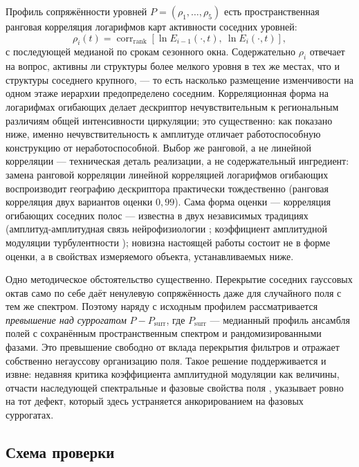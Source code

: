 \documentclass[11pt,a4paper]{article}
\begin{document}
Профиль сопряжённости уровней $P=(\rho_1,\dots,\rho_5)$ есть пространственная ранговая корреляция логарифмов карт активности соседних уровней:
\begin{equation}
\rho_i(t)=\operatorname{corr}_{\mathrm{rank}}\!\left[\ln E_{i-1}(\cdot,t),\ \ln E_{i}(\cdot,t)\right],
\label{eq:rho}
\end{equation}
с последующей медианой по срокам сезонного окна. Содержательно $\rho_i$ отвечает на вопрос, активны ли структуры более мелкого уровня в тех же местах, что и структуры соседнего крупного, --- то есть насколько размещение изменчивости на одном этаже иерархии предопределено соседним. Корреляционная форма на логарифмах огибающих делает дескриптор нечувствительным к региональным различиям общей интенсивности циркуляции; это существенно: как показано ниже, именно нечувствительность к амплитуде отличает работоспособную конструкцию от неработоспособной. Выбор же ранговой, а не линейной корреляции --- техническая деталь реализации, а не содержательный ингредиент: замена ранговой корреляции линейной корреляцией логарифмов огибающих воспроизводит географию дескриптора практически тождественно (ранговая корреляция двух вариантов оценки $0{,}99$). Сама форма оценки --- корреляция огибающих соседних полос --- известна в двух независимых традициях (амплитуд-амплитудная связь нейрофизиологии \cite{Bruns2000,Canolty2006}; коэффициент амплитудной модуляции турбулентности \cite{Mathis2009}); новизна настоящей работы состоит не в форме оценки, а в свойствах измеряемого объекта, устанавливаемых ниже.

Одно методическое обстоятельство существенно. Перекрытие соседних гауссовых октав само по себе даёт ненулевую сопряжённость даже для случайного поля с тем же спектром. Поэтому наряду с исходным профилем рассматривается \emph{превышение над суррогатом} $P-P_{\mathrm{surr}}$, где $P_{\mathrm{surr}}$ --- медианный профиль ансамбля полей с сохранённым пространственным спектром и рандомизированными фазами. Это превышение свободно от вклада перекрытия фильтров и отражает собственно негауссову организацию поля. Такое решение поддерживается и извне: недавняя критика коэффициента амплитудной модуляции как величины, отчасти наследующей спектральные и фазовые свойства поля \cite{CuiJacobi2025}, указывает ровно на тот дефект, который здесь устраняется анкорированием на фазовых суррогатах.

\subsection{Схема проверки}
\end{document}
